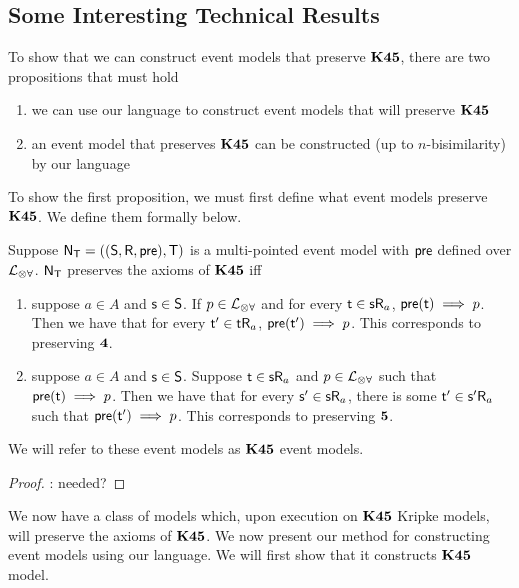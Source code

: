 \subsection{Some Interesting Technical Results}

To show that we can construct event models that preserve $\bf K45$, there are two propositions that
must hold
\begin{enumerate}
	\item we can use our language to construct event models that will preserve $\bf K45$
	\item an event model that preserves $\bf K45$ can be constructed (up to $n$-bisimilarity) by our
		language
\end{enumerate}

To show the first proposition, we must first define what event models preserve $\bf K45$.
We define them formally below.

\begin{lemma} \label{k45EventModel}
	Suppose $\mathrm{\mathsf{N}}_\mathrm{\mathsf{T}} = ((\mathrm{\mathsf{S}},\mathrm{\mathsf{R}},\mathrm{\mathsf{pre}}),\mathrm{\mathsf{T}})$ is a multi-pointed event model with $\mathrm{\mathsf{pre}}$
	defined over $\mathcal{L}_{\otimes\forall}$.
	$\mathrm{\mathsf{N}}_\mathrm{\mathsf{T}}$ preserves the axioms of $\bf K45$ iff
	\begin{enumerate}
		\item \label{k45EventModelConFour} suppose $a \in A$ and $\mathrm{\mathsf{s}} \in \mathrm{\mathsf{S}}$.
			If $p \in \mathcal{L}_{\otimes\forall}$ and for every $\mathrm{\mathsf{t}} \in \mathrm{\mathsf{s}} \mathrm{\mathsf{R}}_a$, $\mathrm{\mathsf{pre}}(\mathrm{\mathsf{t}}) \implies p$.
			Then we have that for every $\mathrm{\mathsf{t}}' \in \mathrm{\mathsf{t}} \mathrm{\mathsf{R}}_a$,
			$\mathrm{\mathsf{pre}}(\mathrm{\mathsf{t}}') \implies p$.
			This corresponds to preserving $\bf 4$.
		\item \label{k45EventModelConFive} suppose $a \in A$ and $\mathrm{\mathsf{s}} \in \mathrm{\mathsf{S}}$.
			Suppose $\mathrm{\mathsf{t}} \in \mathrm{\mathsf{s}} \mathrm{\mathsf{R}}_a$ and $p \in \mathcal{L}_{\otimes\forall}$ such that $\mathrm{\mathsf{pre}}(\mathrm{\mathsf{t}}) \implies p$.
			Then we have that for every $\mathrm{\mathsf{s}}' \in \mathrm{\mathsf{s}} \mathrm{\mathsf{R}}_a$, there is some $\mathrm{\mathsf{t}}' \in \mathrm{\mathsf{s}}' \mathrm{\mathsf{R}}_a$
			such that $\mathrm{\mathsf{pre}}(\mathrm{\mathsf{t}}') \implies p$.
			This corresponds to preserving $\bf 5$.
	\end{enumerate}
	We will refer to these event models as $\bf K45$ event models.
\end{lemma}
\begin{proof}
	\FIXME: needed?
\end{proof}

We now have a class of models which, upon execution on $\bf K45$ Kripke models, will preserve the
axioms of $\bf K45$.
We now present our method for constructing event models using our language.
We will first show that it constructs $\bf K45$ model.

